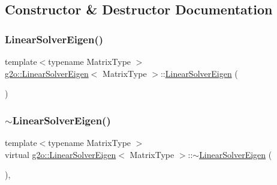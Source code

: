 \subsection{Constructor \& Destructor Documentation}
\mbox{\label{classg2o_1_1_linear_solver_eigen_ac9e7b64d4a559e6972a8b3798f490bd8}} 
\subsubsection{\texorpdfstring{Linear\+Solver\+Eigen()}{LinearSolverEigen()}}
{\footnotesize\ttfamily template$<$typename Matrix\+Type $>$ \\
\mbox{\hyperlink{classg2o_1_1_linear_solver_eigen}{g2o\+::\+Linear\+Solver\+Eigen}}$<$ Matrix\+Type $>$\+::\mbox{\hyperlink{classg2o_1_1_linear_solver_eigen}{Linear\+Solver\+Eigen}} (\begin{DoxyParamCaption}{ }\end{DoxyParamCaption})\hspace{0.3cm}{\ttfamily [inline]}}

\mbox{\label{classg2o_1_1_linear_solver_eigen_afd2eeb1d54a420e110b9b8cdf74b1cff}} 
\subsubsection{\texorpdfstring{$\sim$\+Linear\+Solver\+Eigen()}{~LinearSolverEigen()}}
{\footnotesize\ttfamily template$<$typename Matrix\+Type $>$ \\
virtual \mbox{\hyperlink{classg2o_1_1_linear_solver_eigen}{g2o\+::\+Linear\+Solver\+Eigen}}$<$ Matrix\+Type $>$\+::$\sim$\mbox{\hyperlink{classg2o_1_1_linear_solver_eigen}{Linear\+Solver\+Eigen}} (\begin{DoxyParamCaption}{ }\end{DoxyParamCaption})\hspace{0.3cm}{\ttfamily [inline]}, {\ttfamily [virtual]}}




